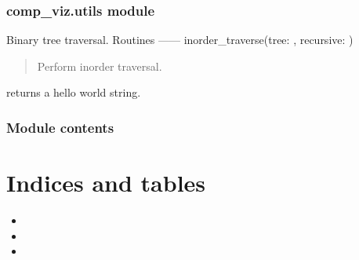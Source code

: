 \documentclass[letterpaper,10pt,english]{sphinxmanual}
\begin{document}
\subsection{comp\_viz.utils module}
\label{\detokenize{comp_viz:module-comp_viz.utils}}\label{\detokenize{comp_viz:comp-viz-utils-module}}
\sphinxAtStartPar
Binary tree traversal.
Routines
——\textendash{}
inorder\_traverse(tree: , recursive: )
\begin{quote}

\sphinxAtStartPar
Perform in\sphinxhyphen{}order traversal.
\end{quote}

\begin{fulllineitems}
\label{\detokenize{comp_viz:comp_viz.utils.hello_world}}
\pysigstartsignatures
{}
\pysigstopsignatures
\sphinxAtStartPar
returns a hello world string.

\end{fulllineitems}



\subsection{Module contents}
\label{\detokenize{comp_viz:module-comp_viz}}\label{\detokenize{comp_viz:module-contents}}

\chapter{Indices and tables}
\label{\detokenize{index:indices-and-tables}}\begin{itemize}
\item {} 
\sphinxAtStartPar
{}

\item {} 
\sphinxAtStartPar
{}

\item {} 
\sphinxAtStartPar
{}

\end{itemize}
\end{document}
